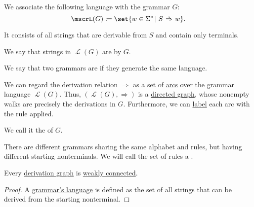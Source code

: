 \begin{definition}
\begin{thmenum}
     We associate the following language with the grammar \( G \):
    \begin{equation*}
      \mscrL(G) \coloneqq \set{ w \in \Sigma^* \given S \reloset + \Rightarrow w }.
    \end{equation*}

    It consists of all strings that are derivable from \( S \) and contain only terminals.

    We say that strings in \( \mscrL(G) \) are  by \( G \).

     We say that two grammars are  if they generate the same language.

    \mimprovised We can regard the derivation relation \( \Rightarrow \) as a set of \hyperref[def:directed_graph/arcs]{arcs} over the grammar language \( \mscrL(G) \). Thus, \( (\mscrL(G), \Rightarrow) \) is a \hyperref[def:directed_graph]{directed graph}, whose nonempty walks are precisely the derivations in \( G \). Furthermore, we can \hyperref[def:labeled_set]{label} each arc with the rule applied.

    We call it the  of \( G \).

     There are different grammars sharing the same alphabet and rules, but having different starting nonterminals. We will call the set of rules a .
  \end{thmenum}
\end{definition}

\begin{proposition}\label{thm:derivation_graph_connected}
  Every \hyperref[def:formal_grammar/graph]{derivation graph} is \hyperref[def:graph_connectedness/weak]{weakly connected}.
\end{proposition}
\begin{proof}
  A \hyperref[def:formal_grammar/language]{grammar's language} is defined as the set of all strings that can be derived from the starting nonterminal.
\end{proof}

